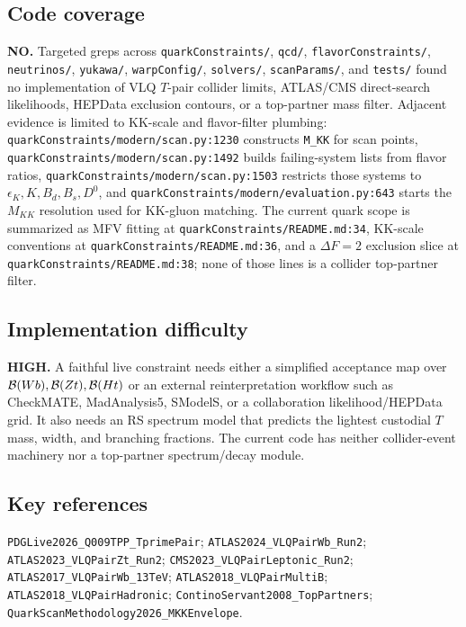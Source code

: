 \subsection*{Code coverage}
\textbf{NO.}  Targeted greps across \texttt{quarkConstraints/}, \texttt{qcd/},
\texttt{flavorConstraints/}, \texttt{neutrinos/}, \texttt{yukawa/},
\texttt{warpConfig/}, \texttt{solvers/}, \texttt{scanParams/}, and
\texttt{tests/} found no implementation of VLQ \(T\)-pair collider limits,
ATLAS/CMS direct-search likelihoods, HEPData exclusion contours, or a
top-partner mass filter.  Adjacent evidence is limited to KK-scale and
flavor-filter plumbing: \texttt{quarkConstraints/modern/scan.py:1230}
constructs \texttt{M\_KK} for scan points, \texttt{quarkConstraints/modern/scan.py:1492}
builds failing-system lists from flavor ratios, \texttt{quarkConstraints/modern/scan.py:1503}
restricts those systems to \(\epsilon_K,K,B_d,B_s,D^0\), and
\texttt{quarkConstraints/modern/evaluation.py:643} starts the \(M_{KK}\)
resolution used for KK-gluon matching.  The current quark scope is summarized
as MFV fitting at \texttt{quarkConstraints/README.md:34}, KK-scale conventions
at \texttt{quarkConstraints/README.md:36}, and a \(\Delta F=2\) exclusion
slice at \texttt{quarkConstraints/README.md:38}; none of those lines is a
collider top-partner filter.

\subsection*{Implementation difficulty}
\textbf{HIGH.}  A faithful live constraint needs either a simplified
acceptance map over \({\cal B}(Wb),{\cal B}(Zt),{\cal B}(Ht)\) or an external
reinterpretation workflow such as CheckMATE, MadAnalysis5, SModelS, or a
collaboration likelihood/HEPData grid.  It also needs an RS spectrum model
that predicts the lightest custodial \(T\) mass, width, and branching
fractions.  The current code has neither collider-event machinery nor a
top-partner spectrum/decay module.

\subsection*{Key references}
\texttt{PDGLive2026\_Q009TPP\_TprimePair};
\texttt{ATLAS2024\_VLQPairWb\_Run2};
\texttt{ATLAS2023\_VLQPairZt\_Run2};
\texttt{CMS2023\_VLQPairLeptonic\_Run2};
\texttt{ATLAS2017\_VLQPairWb\_13TeV};
\texttt{ATLAS2018\_VLQPairMultiB};
\texttt{ATLAS2018\_VLQPairHadronic};
\texttt{ContinoServant2008\_TopPartners};
\texttt{QuarkScanMethodology2026\_MKKEnvelope}.

